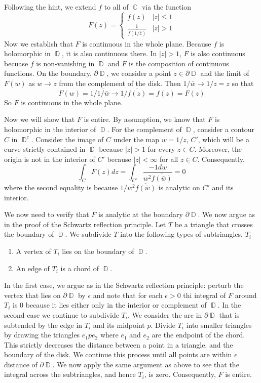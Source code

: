 \documentclass{article}
\DeclareMathOperator{\C}{\mathbb{C}}
\DeclareMathOperator{\D}{\mathbb{D}}
\newcommand{\exercise}[1]{\noindent{\textbf{Exercise #1:}}}
\newcommand{\conj}[1]{\overline{#1}}
\begin{document}
\exercise{2.6.15}

Following the hint, we extend $f$ to all of $\C$ via the function
\[
F(z) =
\begin{cases}
  f(z) & |z| \leq 1 \\
  \frac{1}{\conj{f(1/\bar{z})}} & |z| > 1
\end{cases}
\]
Now we establish that $F$ is continuous in the whole plane. Because
$f$ is holomorphic in $\D$, it is also continuous there. In $|z| > 1$,
$F$ is also continuous becuase $f$ is non-vanishing in $\D$ and $F$ is
the composition of continuous functions. On the boundary,
$\partial\D$, we consider a point $z \in \partial\D$ and the limit of
$F(w)$ as $w \to z$ from the complement of the disk. Then $1/\bar{w}
\to 1/z = z$ so that
\[
F(w) = 1/\conj{1/\bar{w}} \to 1/\conj{f(z)} = f(z) = F(z)
\]
So $F$ is continuous in the whole plane.

Now we will show that $F$ is entire. By assumption, we know that $F$
is holomorphic in the interior of $\D$. For the complement of $\D$,
consider a contour $C$ in $\D^c$. Consider the image of $C$ under the
map $w = 1/z$, $C'$, which will be a curve strictly contained in $\D$
because $|z| > 1$ for every $z \in C$. Moreover, the origin is not in
the interior of $C'$ because $|z| < \infty$ for all $z \in
C$. Consequently,
\[
\int_C F(z)dz = \int_{C'}\frac{-1dw}{w^2\conj{f(\bar{w})}} = 0
\]
where the second equality is because $1/w^2\conj{f(\bar{w})}$ is
analytic on $C'$ and its interior.

We now need to verify that $F$ is analytic at the boundary $\partial
\D$. We now argue as in the proof of the Schwartz reflection
principle. Let $T$ be a triangle that crosses the boundary of
$\D$. We subdivide $T$ into the following types of subtriangles, $T_i$
\begin{enumerate}
\item A vertex of $T_i$ lies on the boundary of $\D$.
\item An edge of $T_i$ is a chord of $\D$.
\end{enumerate}
In the first case, we argue as in the Schwartz reflection principle:
perturb the vertex that lies on $\partial \D$ by $\epsilon$ and note
that for each $\epsilon > 0$ thi integral of $F$ around $T_i$ is 0
because it lies either only in the interior or complement of $\D$. In
the second case we continue to subdivide $T_i$. We consider the arc in
$\partial \D$ that is subtended by the edge in $T_i$ and its midpoint
$p$. Divide $T_i$ into smaller triangles by drawing the triangles
$e_1pe_2$ where $e_1$ and $e_2$ are the endpoint of the chord. This
strictly decreases the distance between a point in a triangle, and the
boundary of the disk. We continue this process until all points are
within $\epsilon$ distance of $\partial\D$. We now apply the same
argument as above to see that the integral across the subtriangles,
and hence $T_i$, is zero. Consequently, $F$ is entire.
\end{document}
